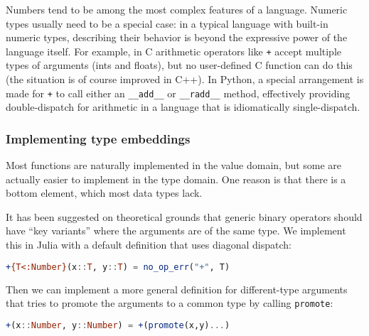 

Numbers tend to be among the most complex features of a language.
Numeric types usually need to be a special case: in a typical language with
built-in numeric types, describing their behavior is beyond the expressive power
of the language itself.
For example, in C arithmetic operators like \texttt{+} accept multiple types of
arguments (ints and floats), but no user-defined C function can do this (the situation
is of course improved in C++).
In Python, a special arrangement is made for \texttt{+} to call either an
\texttt{\_\_add\_\_} or \texttt{\_\_radd\_\_} method,
effectively providing double-dispatch for arithmetic in a language that is
idiomatically single-dispatch.

\subsubsection{Implementing type embeddings}
\label{sec:promotion}

Most functions are naturally implemented in the value domain, but some are
actually easier to implement in the type domain.
One reason is that there is a bottom element, which most data types lack.

It has been suggested on theoretical grounds \cite{categorytheoryoperators}
that generic binary operators should have ``key variants'' where the
arguments are of the same type.
We implement this in Julia with a default definition that uses diagonal
dispatch:

\begin{singlespace}
\begin{lstlisting}[language=julia]
+{T<:Number}(x::T, y::T) = no_op_err("+", T)
\end{lstlisting}
\end{singlespace}

Then we can implement a more general definition for different-type arguments
that tries to promote the arguments to a common type by calling \texttt{promote}:

\begin{singlespace}
\begin{lstlisting}[language=julia]
+(x::Number, y::Number) = +(promote(x,y)...)
\end{lstlisting}
\end{singlespace}


